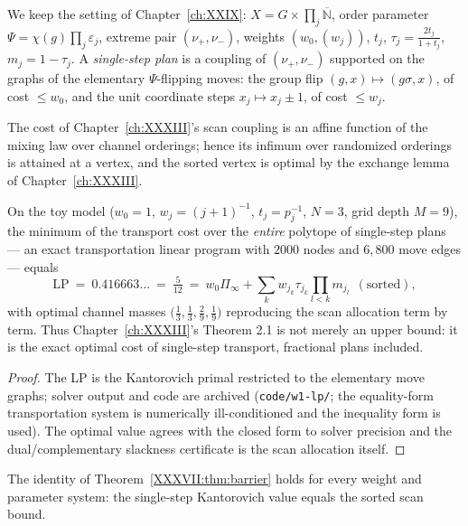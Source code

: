 We keep the setting of Chapter~\ref{ch:XXIX}: $X=G\times\prod_j\overline{\mathbb N}$, order
parameter $\Psi=\chi(g)\prod_j\varepsilon_j$, extreme pair $(\nu_+,\nu_-)$, weights
$(w_0,(w_j))$, $t_j$, $\tau_j=\frac{2t_j}{1+t_j}$, $m_j=1-\tau_j$. A \emph{single-step
plan} is a coupling of $(\nu_+,\nu_-)$ supported on the graphs of the elementary
$\Psi$-flipping moves: the group flip $(g,x)\mapsto(g\sigma,x)$, of cost $\le w_0$, and
the unit coordinate steps $x_j\mapsto x_j\pm1$, of cost $\le w_j$.

\begin{proposition}\label{XXXVII:prop:affine}
The cost of Chapter~\ref{ch:XXXIII}'s scan coupling is an affine function of the mixing law over
channel orderings; hence its infimum over randomized orderings is attained at a vertex,
and the sorted vertex is optimal by the exchange lemma of Chapter~\ref{ch:XXXIII}.
\end{proposition}

\begin{theorem}\label{XXXVII:thm:barrier}
On the toy model ($w_0=1$, $w_j=(j{+}1)^{-1}$, $t_j=p_j^{-1}$, $N=3$, grid depth $M=9$),
the minimum of the transport cost over the \emph{entire} polytope of single-step plans
--- an exact transportation linear program with $2000$ nodes and $6{,}800$ move edges ---
equals
\[
\mathrm{LP}\ =\ 0.416663\ldots\ =\ \tfrac{5}{12}\ =\
w_0\Pi_\infty+\sum_kw_{j_k}\tau_{j_k}\prod_{l<k}m_{j_l}\ \ (\text{sorted}),
\]
with optimal channel masses $\bigl(\tfrac13,\tfrac13,\tfrac29,\tfrac19\bigr)$ reproducing
the scan allocation term by term. Thus Chapter~\ref{ch:XXXIII}'s Theorem 2.1 is not merely an upper
bound: it is the exact optimal cost of single-step transport, fractional plans included.
\end{theorem}

\begin{proof}
The LP is the Kantorovich primal restricted to the elementary move graphs; solver output
and code are archived (\texttt{code/w1-lp/}; the equality-form transportation system is
numerically ill-conditioned and the inequality form is used). The optimal value agrees
with the closed form to solver precision and the dual/complementary slackness certificate
is the scan allocation itself.
\end{proof}

\begin{conjecture}\label{XXXVII:conj:general}
The identity of Theorem~\ref{XXXVII:thm:barrier} holds for every weight and parameter system:
the single-step Kantorovich value equals the sorted scan bound.
\end{conjecture}

